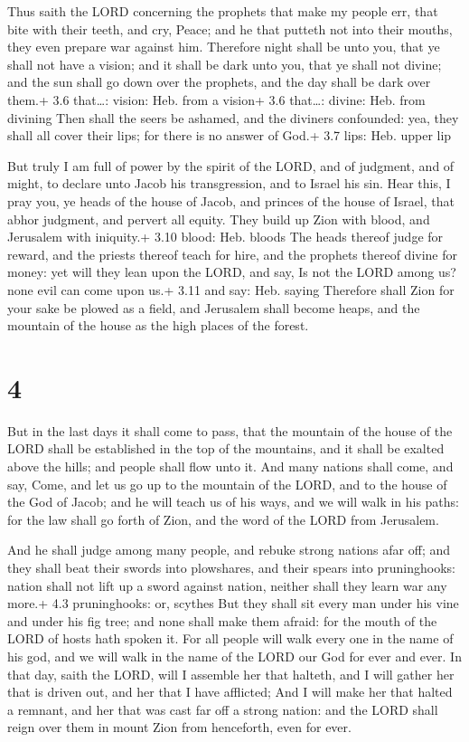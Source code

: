 Thus saith the LORD concerning the prophets that make my
people err, that bite with their teeth, and cry, Peace; and he that
putteth not into their mouths, they even prepare war against him.
 Therefore night shall be unto you, that ye shall not have a
vision; and it shall be dark unto you, that ye shall not divine; and the
sun shall go down over the prophets, and the day shall be dark over
them.+ 3.6 that\ldots: vision: Heb. from a vision+ 3.6 that\ldots:
divine: Heb. from divining  Then shall the seers be ashamed,
and the diviners confounded: yea, they shall all cover their lips; for
there is no answer of God.+ 3.7 lips: Heb. upper lip

 But truly I am full of power by the spirit of the LORD,
and of judgment, and of might, to declare unto Jacob his transgression,
and to Israel his sin.  Hear this, I pray you, ye heads of
the house of Jacob, and princes of the house of Israel, that abhor
judgment, and pervert all equity.  They build up Zion with
blood, and Jerusalem with iniquity.+ 3.10 blood: Heb. bloods
 The heads thereof judge for reward, and the priests
thereof teach for hire, and the prophets thereof divine for money: yet
will they lean upon the LORD, and say, Is not the LORD among us? none
evil can come upon us.+ 3.11 and say: Heb. saying 
Therefore shall Zion for your sake be plowed as a field, and Jerusalem
shall become heaps, and the mountain of the house as the high places of
the forest.

\hypertarget{section-3}{%
\section{4}\label{section-3}}

 But in the last days it shall come to pass, that the
mountain of the house of the LORD shall be established in the top of the
mountains, and it shall be exalted above the hills; and people shall
flow unto it.  And many nations shall come, and say, Come,
and let us go up to the mountain of the LORD, and to the house of the
God of Jacob; and he will teach us of his ways, and we will walk in his
paths: for the law shall go forth of Zion, and the word of the LORD from
Jerusalem.

 And he shall judge among many people, and rebuke strong
nations afar off; and they shall beat their swords into plowshares, and
their spears into pruninghooks: nation shall not lift up a sword against
nation, neither shall they learn war any more.+ 4.3 pruninghooks: or,
scythes  But they shall sit every man under his vine and
under his fig tree; and none shall make them afraid: for the mouth of
the LORD of hosts hath spoken it.  For all people will walk
every one in the name of his god, and we will walk in the name of the
LORD our God for ever and ever.  In that day, saith the
LORD, will I assemble her that halteth, and I will gather her that is
driven out, and her that I have afflicted;  And I will make
her that halted a remnant, and her that was cast far off a strong
nation: and the LORD shall reign over them in mount Zion from
henceforth, even for ever.

